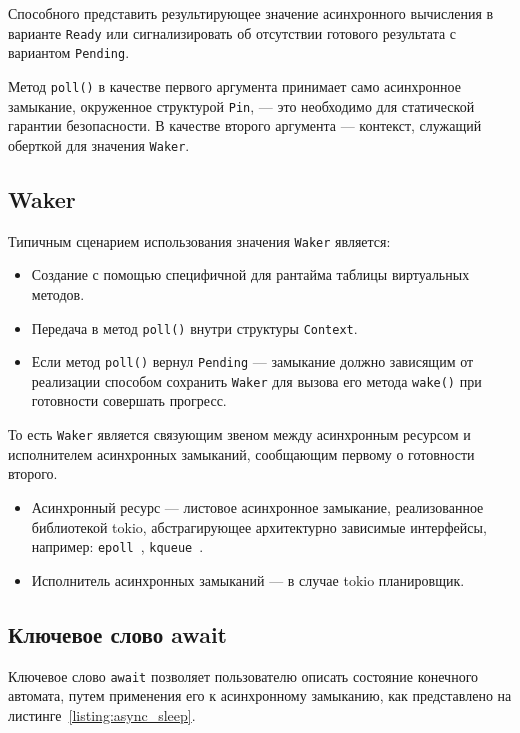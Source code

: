 Способного представить результирующее значение асинхронного вычисления в варианте \verb|Ready| или сигнализировать об отсутствии готового результата с вариантом \verb|Pending|.

Метод \verb|poll()| в качестве первого аргумента принимает само асинхронное замыкание, окруженное структурой \verb|Pin|, --- это необходимо для статической гарантии безопасности. В качестве второго аргумента --- контекст, служащий оберткой для значения \verb|Waker|.

\subsection{Waker}
Типичным сценарием использования значения \verb|Waker| является:

\begin{itemize}
    \item Создание с помощью специфичной для рантайма таблицы виртуальных методов.
    \item Передача в метод \verb|poll()| внутри структуры \verb|Context|.
    \item Если метод \verb|poll()| вернул \verb|Pending| --- замыкание должно зависящим от реализации способом сохранить \verb|Waker| для вызова его метода \verb|wake()| при готовности совершать прогресс.
\end{itemize}

То есть \verb|Waker| является связующим звеном между асинхронным ресурсом и исполнителем асинхронных замыканий, сообщающим первому о готовности второго.

\begin{itemize}
    \item Асинхронный ресурс --- листовое асинхронное замыкание, реализованное библиотекой tokio, абстрагирующее архитектурно зависимые интерфейсы, например: \verb|epoll|~\cite{epollLib}, \verb|kqueue|~\cite{kqueue}.
    \item Исполнитель асинхронных замыканий --- в случае tokio планировщик.
\end{itemize}

\subsection{Ключевое слово await}

Ключевое слово \verb|await| позволяет пользователю описать состояние конечного автомата, путем применения его к асинхронному замыканию, как представлено на листинге~\ref{listing:async_sleep}.

